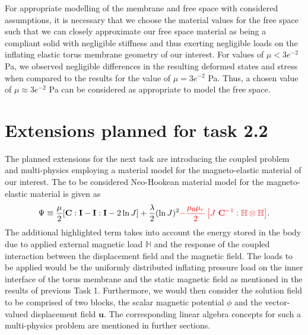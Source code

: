 \documentclass[11pt,a4paper,final]{article}
\begin{document}
For appropriate modelling of the membrane and free space with considered assumptions, it is necessary that we choose the material values for the free space such that we can closely approximate our free space material as being a compliant solid with negligible stiffness and thus exerting negligible loads on the inflating elastic torus membrane geometry of our interest. For values of $\mu < 3e^{-2}$ Pa, we observed negligible differences in the resulting deformed states and stress when compared to the results for the value of $\mu = 3e^{-2}$ Pa. Thus, a chosen value of $\mu \approx 3e^{-2}$ Pa can be considered as appropriate to model the free space. \par 

\section{Extensions planned for task 2.2}
The planned extensions for the next task are introducing the coupled problem and multi-physics employing a material model for the magneto-elastic material of our interest. The to be considered Neo-Hookean material model for the magneto-elastic material is given as
\begin{equation}
\Psi \equiv \dfrac{\mu}{2} [\mathbf{C} : \mathbf{I} - \mathbf{I} : \mathbf{I} - 2 \ln J] + \dfrac{\lambda}{2} (\ln J)^2 \textcolor{red}{- \dfrac{\mu_0 \mu_r}{2} \left[ J \ \mathbf{C}^{-1} : \mathbb{H} \otimes \mathbb{H} \right]}.
\end{equation}
The additional highlighted term takes into account the energy stored in the body due to applied external magnetic load $\mathbb{H}$ and the response of the coupled interaction between the displacement field and the magnetic field. The loads to be applied would be the uniformly distributed inflating pressure load on the inner interface of the torus membrane and the static magnetic field as mentioned in the results of previous Task 1. Furthermore, we would then consider the solution field to be comprised of two blocks, the scalar magnetic potential $\phi$ and the vector-valued displacement field $\mathbf{u}$. The corresponding linear algebra concepts for such a multi-physics problem are mentioned in further sections.
\end{document}
